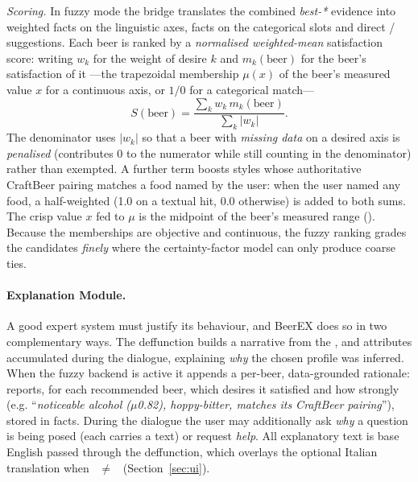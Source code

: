 \emph{Scoring.} In fuzzy mode the  bridge translates
the combined \emph{best-*} evidence into weighted  facts on the
linguistic axes,  facts on the categorical slots and direct
/ suggestions. Each beer is ranked by a
\emph{normalised weighted-mean} satisfaction score: writing $w_k$ for the weight
of desire $k$ and $m_k(\text{beer})$ for the beer's satisfaction of it ---the
trapezoidal membership $\mu(x)$ of the beer's measured value $x$ for a continuous
axis, or $1/0$ for a categorical match---
\begin{equation}
S(\text{beer})=\frac{\sum_k w_k\,m_k(\text{beer})}{\sum_k |w_k|}.
\label{eq:score}
\end{equation}
The denominator uses $|w_k|$ so that a beer with \emph{missing data} on a desired
axis is \emph{penalised} (contributes $0$ to the numerator while still counting
in the denominator) rather than exempted. A further term boosts styles whose
authoritative CraftBeer pairing matches a food named by the user: when the user
named any food, a half-weighted  (1.0 on a textual hit, 0.0
otherwise) is added to both sums. The crisp value $x$ fed to $\mu$ is the
midpoint of the beer's measured range (). Because the
memberships are objective and continuous, the fuzzy ranking grades the candidates
\emph{finely} where the certainty-factor model can only produce coarse ties.

\paragraph{Explanation Module.}
A good expert system must justify its behaviour, and BeerEX does so in two
complementary ways. The  deffunction builds a narrative
from the ,  and
 attributes accumulated during the dialogue, explaining
\emph{why} the chosen profile was inferred. When the fuzzy backend is active it
appends a per-beer, data-grounded rationale:  reports, for
each recommended beer, which desires it satisfied and how strongly (e.g.
``\emph{noticeable alcohol (\(\mu\)0.82), hoppy-bitter, matches its CraftBeer
pairing}''), stored in  facts. During the dialogue the user may
additionally ask \emph{why} a question is being posed (each 
carries a  text) or request \emph{help}. All explanatory text is base
English passed through the  deffunction, which overlays the optional
Italian translation when ~$\ne$~ (Section~\ref{sec:ui}).

